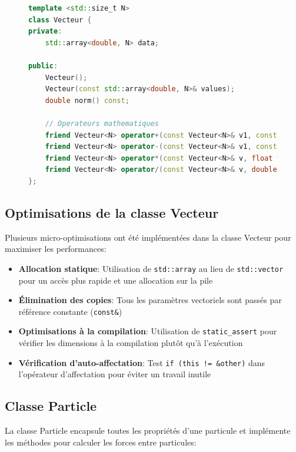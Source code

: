 \documentclass[12pt,a4paper]{article}
\begin{document}
\begin{figure}[H]
\begin{lstlisting}[language=C++, caption=Extrait de la classe Vecteur]
template <std::size_t N>
class Vecteur {
private:
    std::array<double, N> data;

public:
    Vecteur();
    Vecteur(const std::array<double, N>& values);
    double norm() const;
    
    // Operateurs mathematiques
    friend Vecteur<N> operator+(const Vecteur<N>& v1, const Vecteur<N>& v2);
    friend Vecteur<N> operator-(const Vecteur<N>& v1, const Vecteur<N>& v2);
    friend Vecteur<N> operator*(const Vecteur<N>& v, float f);
    friend Vecteur<N> operator/(const Vecteur<N>& v, double d);
};
\end{lstlisting}
\end{figure}

\subsection{Optimisations de la classe Vecteur}

Plusieurs micro-optimisations ont été implémentées dans la classe Vecteur pour maximiser les performances:

\begin{itemize}
    \item \textbf{Allocation statique}: Utilisation de \texttt{std::array} au lieu de \texttt{std::vector} pour un accès plus rapide et une allocation sur la pile
    \item \textbf{Élimination des copies}: Tous les paramètres vectoriels sont passés par référence constante (\texttt{const\&})
    \item \textbf{Optimisations à la compilation}: Utilisation de \texttt{static\_assert} pour vérifier les dimensions à la compilation plutôt qu'à l'exécution
    \item \textbf{Vérification d'auto-affectation}: Test \texttt{if (this != \&other)} dans l'opérateur d'affectation pour éviter un travail inutile
\end{itemize}

\subsection{Classe Particle}

La classe Particle encapsule toutes les propriétés d'une particule et implémente les méthodes pour calculer les forces entre particules:
\end{document}
